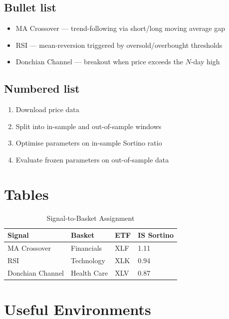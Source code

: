 \documentclass[12pt, a4paper]{article}
\begin{document}
\subsection{Bullet list}
\begin{itemize}
    \item MA Crossover --- trend-following via short/long moving average gap
    \item RSI --- mean-reversion triggered by oversold/overbought thresholds
    \item Donchian Channel --- breakout when price exceeds the $N$-day high
\end{itemize}

\subsection{Numbered list}
\begin{enumerate}
    \item Download price data
    \item Split into in-sample and out-of-sample windows
    \item Optimise parameters on in-sample Sortino ratio
    \item Evaluate frozen parameters on out-of-sample data
\end{enumerate}

\section{Tables}

\begin{table}[h]
    \centering
    \caption{Signal-to-Basket Assignment}
    \begin{tabular}{llll}
        \toprule
        \textbf{Signal} & \textbf{Basket} & \textbf{ETF} & \textbf{IS Sortino} \\
        \midrule
        MA Crossover      & Financials   & XLF & 1.11 \\
        RSI               & Technology   & XLK & 0.94 \\
        Donchian Channel  & Health Care  & XLV & 0.87 \\
        \bottomrule
    \end{tabular}
    \label{tab:signals}
\end{table}

\section{Useful Environments}
\end{document}
